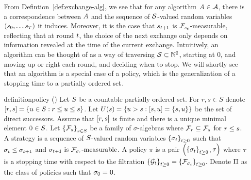 From Defintion~\ref{def:exchange-alg}, we see that for any algorithm $A\in\mathcal{A}$, there is a correspondence
between $A$ and the sequence of $\mathcal{S}$-valued random variables 
\(
    \left(
        s_{0},
        \ldots
        s_{T}
    \right)
\)
it induces. Moreover, it is the case that 
\(
    s_{t+1}
\)
is
\(
    \mathcal{F}_{
        s_{t}
    }
\)-measurable, reflecting that at round $t$, the choice of the next exchange
only depends on information revealed at the time of the current exchange.
Intuitively, an algorithm can be thought of as a way of traversing $\mathcal{S}\subset\mathbb{N}^2$, starting at $0$, and moving up or right
each round,
and deciding when to stop.
We will shortly see that an algorithm is a special case of 
a policy, which is the generalization of a stopping time to a partially ordered set.
\begin{restatable}{definition}{policy}
    \label{def:policy} 
    \textup{
        (\citet{mandelbaum1981optimal})
    }
    Let $S$ be a countable partially ordered set. For $r,s\in S$ denote
    \(
        \left[r,s\right]
        =
        \left\{
            u\in S: r\leq u\leq s
        \right\} 
    \).
     Let 
    \(
        U(
            s
        )
        =
        \left\{
            u> s: \left[s,u\right]=\left\{s,u\right\}
        \right\} 
    \) be the set of direct successors.
    Assume that $\left[r,s\right]$ is finite and there is a unique minimal element $0\in S$. 
    Let 
    \(
        \left\{\mathcal{F}_{s}\right\}_{
            s\in S
        }
    \)
    be a family of $\sigma$-algebras where $\mathcal{F}_r\subseteq\mathcal{F}_s$ for $r\leq s$. A strategy is 
    a sequence of $S$-valued random variables $\left\{\sigma_t\right\}_{t\geq 0}$ such that 
    \(
        \sigma_t \leq \sigma_{t+1}
    \)
    and
    \(
        \sigma_{t+1} \text{ is }
        \mathcal{F}_{\sigma_t}\text{-measurable}
    \).
    A policy $\pi$ is a pair
    \(
        \left(
            \left\{
                \sigma_{t}
            \right\}_{t\geq 0},
            \tau
        \right)
    \)
    where $\tau$ is a stopping time with respect to the filtration
    \(
        \left\{
            \mathcal{G}_{t}
        \right\}_{t\geq 0}
        =
        \left\{
            \mathcal{F}_{
                \sigma_{t}
            }
        \right\}_{t\geq 0}
    \).
    Denote $\Pi$ as the class of policies such that $\sigma_{0}=0$.
\end{restatable}  

